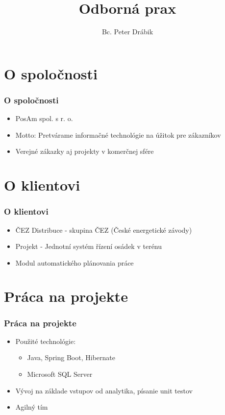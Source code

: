 \documentclass[pdf]{beamer}
\title{Odborná prax}
\author{Bc. Peter Drábik}
\begin{document}
\date{}
\begin{frame}
    \titlepage 
\end{frame}

\section{O spoločnosti}
\begin{frame}
    \frametitle{O spoločnosti}
    \begin{itemize}
        \setlength\itemsep{1em}
        \item PosAm spol. s r. o.
        \item Motto: Pretvárame informačné technológie na úžitok pre zákazníkov
        \item Verejné zákazky aj projekty v komerčnej sfére
    \end{itemize}
\end{frame}

\section{O klientovi}
\begin{frame}
    \frametitle{O klientovi}
    \begin{itemize}
        \setlength\itemsep{1em}
        \item ČEZ Distribuce - skupina ČEZ (České energetické závody)
        \item Projekt - Jednotní systém řízení osádek v terénu
        \item Modul automatického plánovania práce
    \end{itemize}
\end{frame}

\section{Práca na projekte}
\begin{frame}
    \frametitle{Práca na projekte}
    \begin{itemize}
        \setlength\itemsep{1em}
        \item Použité technológie:
        \begin{itemize}
            \item Java, Spring Boot, Hibernate
            \item Microsoft SQL Server
        \end{itemize}        
        \item Vývoj na základe vstupov od analytika, písanie unit testov
        \item Agilný tím
    \end{itemize}    
\end{frame}
\end{document}

